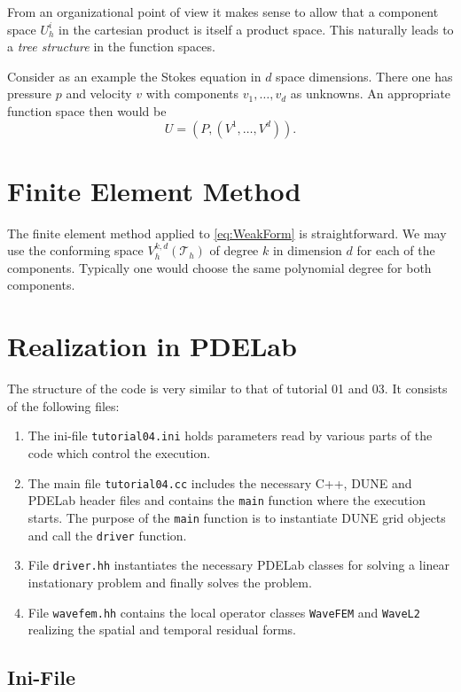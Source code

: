 \documentclass[a4paper,12pt]{article}
\begin{document}
From an organizational point of view it makes sense to allow that
a component space $U_h^i$ in the cartesian product is itself
a product space. This naturally leads to a \textit{tree structure} in the
function spaces.

Consider as an example the Stokes equation in $d$ space dimensions.
There one has pressure $p$ and velocity $v$ with components $v_1,\ldots,v_d$
as unknowns. An appropriate function space then would be
$$ U = (P,(V^1,\ldots,V^d)).$$

\section{Finite Element Method}

The finite element method applied to \eqref{eq:WeakForm} is straightforward.
We may use the conforming space $V_h^{k,d}(\mathcal{T}_h)$ of degree $k$
in dimension $d$ for each of the components. Typically one would choose
the same polynomial degree for both components.

\section{Realization in PDELab}

The structure of the code is very similar to that of tutorial 01 and 03.
It consists of the following files:
\begin{enumerate}[1)]
\item The ini-file
\lstinline{tutorial04.ini} holds parameters read by various parts of the code
which control the execution.
\item The main file \lstinline{tutorial04.cc} includes the necessary C++,
DUNE and PDELab header files
and contains the \lstinline{main} function where the execution starts.
The purpose of the \lstinline{main} function is
to instantiate DUNE grid objects and call the \lstinline{driver} function.
\item File \lstinline{driver.hh} instantiates the necessary PDELab classes
for solving a linear instationary problem and finally solves the problem.
\item File \lstinline{wavefem.hh} contains the local operator classes
\lstinline{WaveFEM} and \lstinline{WaveL2} realizing the spatial
and temporal residual forms.
\end{enumerate}

\subsection{Ini-File}
\end{document}
